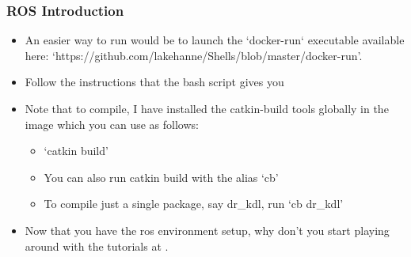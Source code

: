 \begin{frame}
\frametitle{ROS Introduction}
	\begin{itemize}
		\item An easier way to run would be to launch the `docker-run` executable available here: `https://github.com/lakehanne/Shells/blob/master/docker-run'.
		\item Follow the instructions that the bash script gives you 
		\item Note that to compile, I have installed the catkin-build tools globally in the image which you can use as follows:
		\begin{itemize}
			\item `catkin build'
			\item You can also run catkin build with the alias `cb'
			\item To compile just a single package, say dr\_kdl, 		run `cb dr\_kdl'
		\end{itemize}
		
		\item Now that you have the ros environment setup, why don't you start playing around with the tutorials at \textsf{\href{http://wiki.ros.org/ROS/Tutorials}{}}.
	\end{itemize}
\end{frame}
